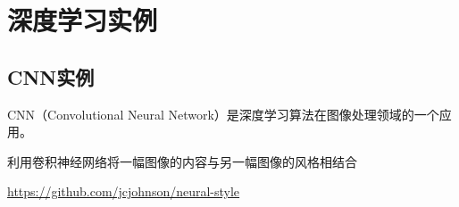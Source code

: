 \chapter{深度学习实例}
\section{CNN实例}
CNN（Convolutional Neural Network）是深度学习算法在图像处理领域的一个应用。

利用卷积神经网络将一幅图像的内容与另一幅图像的风格相结合~\cite{Johnson2015}

\url{https://github.com/jcjohnson/neural-style}

